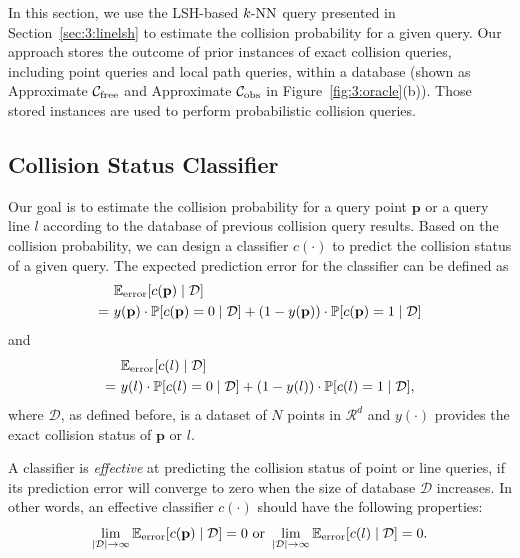 In this section, we use the LSH-based $k\text{-NN}$ query presented in Section~\ref{sec:3:linelsh} to estimate the collision probability for a given query.
Our approach stores the outcome of prior instances of exact collision queries, including point queries and local path queries, within a database (shown as Approximate $\mathcal C_{\text{free}}$ and Approximate $\mathcal C_{\text{obs}}$ in Figure~\ref{fig:3:oracle}(b)). Those stored instances are used to perform probabilistic collision queries.

\subsection{Collision Status Classifier}
\label{subsec:3:knnreasoning:classifier}

Our goal is to estimate the collision probability for a query point $\mathbf p$ or a query line $l$ according to the database of previous collision query results. Based on the collision probability, we can design a classifier $c(\cdot)$ to predict the collision status of a given query. The expected prediction error for the classifier can be defined as
\begin{align}
& \ \mathbb E_{\text{error}}[c(\mathbf p) \mid \mathcal D]  \notag \\
=& \ y(\mathbf p) \cdot \mathbb P[c(\mathbf p) = 0 \mid \mathcal D] + (1 - y(\mathbf p)) \cdot \mathbb P[c(\mathbf p) = 1 \mid \mathcal D] \notag
\end{align}
and
\begin{align}
&\ \mathbb E_{\text{error}}[c(l) \mid \mathcal D] \notag \\
=& \ y(l) \cdot \mathbb P[c(l) = 0 \mid \mathcal D] + (1 - y(l)) \cdot \mathbb P[c(l) = 1 \mid \mathcal D], \notag
\end{align}
where $\mathcal D$, as defined before, is a dataset of $N$ points in $\mathcal R^d$ and $y(\cdot)$ provides the exact collision status of $\mathbf p$ or $l$.

A classifier is \emph{effective} at predicting the collision status of point or line queries, if its prediction error will converge to zero when the size
of database $\mathcal D$ increases. In other words, an effective classifier $c(\cdot)$ should have the following properties:
\begin{equation}
\lim_{|\mathcal D| \rightarrow \infty} \mathbb E_{\text{error}}[c(\mathbf p) \mid \mathcal D] = 0 \text{ or }
\lim_{|\mathcal D| \rightarrow \infty} \mathbb E_{\text{error}}[c(l) \mid \mathcal D] = 0. \notag
\end{equation}

